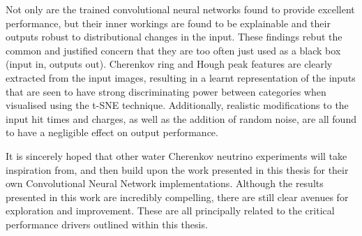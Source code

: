 \begin{table}
    \caption[Number of events passing successive selection cuts for each event category]
    {The total number of expected (weighted) events and the number that pass successive selection
        cuts for the different event categories. The preselection, \emph{cosmic score} cut, and
        \emph{escapes score} cut numbers are shown. The selection efficiency relative to the total
        number of events after all cuts have been applied is also shown for each event category.}
    \label{tab:selection}
\end{table}

Not only are the trained convolutional neural networks found to provide excellent performance, but
their inner workings are found to be explainable and their outputs robust to distributional
changes in the input. These findings rebut the common and justified concern that they are too
often just used as a black box (input in, outputs out). Cherenkov ring and Hough peak features are
clearly extracted from the input images, resulting in a learnt representation of the inputs that
are seen to have strong discriminating power between categories when visualised using the t-SNE
technique. Additionally, realistic modifications to the input hit times and charges, as well as
the addition of random noise, are all found to have a negligible effect on output performance.

It is sincerely hoped that other water Cherenkov neutrino experiments will take inspiration from,
and then build upon the work presented in this thesis for their own Convolutional Neural Network
implementations. Although the results presented in this work are incredibly compelling, there are
still clear avenues for exploration and improvement. These are all principally related to the
critical performance drivers outlined within this thesis. 

